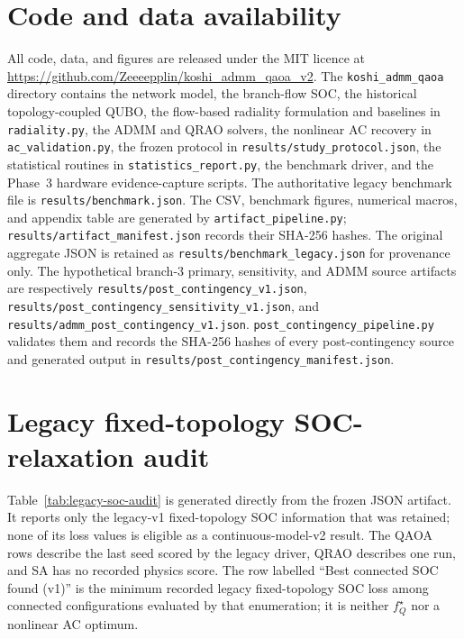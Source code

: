 \documentclass[5p,twocolumn,number,sort&compress,nopreprintline]{elsarticle}
\newcommand{\code}[1]{\texttt{\small #1}}
\begin{document}
\section*{Code and data availability}
All code, data, and figures are released under the MIT licence at
\url{https://github.com/Zeeeepplin/koshi_admm_qaoa_v2}.
The \code{koshi\_admm\_qaoa} directory contains the network model, the
branch-flow SOC, the historical topology-coupled QUBO, the flow-based
radiality formulation and baselines in \code{radiality.py}, the ADMM
and QRAO solvers, the nonlinear AC recovery in \code{ac\_validation.py},
the frozen protocol in \code{results/study\_protocol.json}, the
statistical routines in \code{statistics\_report.py}, the benchmark
driver, and the Phase~3 hardware evidence-capture scripts. The
authoritative legacy benchmark file is
\code{results/benchmark.json}. The CSV, benchmark figures, numerical
macros, and appendix table are generated by
\code{artifact\_pipeline.py}; \code{results/artifact\_manifest.json}
records their SHA-256 hashes. The original aggregate JSON is retained
as \code{results/benchmark\_legacy.json} for provenance only. The
hypothetical branch-3 primary, sensitivity, and ADMM source artifacts
are respectively \code{results/post\_contingency\_v1.json},
\code{results/post\_contingency\_sensitivity\_v1.json}, and
\code{results/admm\_post\_contingency\_v1.json}.
\code{post\_contingency\_pipeline.py} validates them and records the
SHA-256 hashes of every post-contingency source and generated output in
\code{results/post\_contingency\_manifest.json}.

\appendix

\section{Legacy fixed-topology SOC-relaxation audit}
\label{app:legacy-soc-audit}
Table~\ref{tab:legacy-soc-audit} is generated directly from the frozen JSON
artifact. It reports only the legacy-v1 fixed-topology SOC information
that was retained; none of its loss values is eligible as a
continuous-model-v2 result. The QAOA rows describe the last seed scored by the
legacy driver, QRAO describes one run, and SA has no recorded physics
score. The row labelled ``Best connected SOC found (v1)'' is the
minimum recorded legacy fixed-topology SOC loss among connected
configurations evaluated by that enumeration; it is neither
$f_Q^\star$ nor a nonlinear AC optimum.




\end{document}
